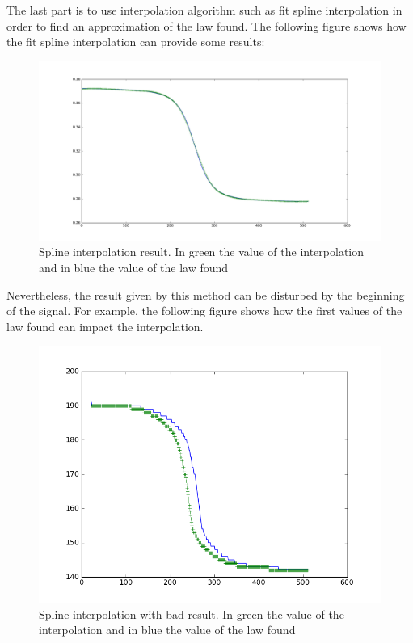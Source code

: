 The last part is to use interpolation algorithm such as fit spline interpolation in order to find an approximation of the law found. The following figure shows how the fit spline interpolation can provide some results:

\begin{figure}[H]
\centering
    \includegraphics[scale=0.35,angle=0]{Images/spline_pour_la_loi_de_frequence_trouvee.png}
    \caption{Spline interpolation result. In green the value of the interpolation and in blue the value of the law found}
    \label{fig:spline_pour_la_loi_de_frequence_trouvee}
\end{figure}

Nevertheless, the result given by this method can be disturbed by the beginning of the signal. For example, the following figure shows how the first values of the law found can impact the interpolation.

\begin{figure}[H]
\centering
    \includegraphics[scale=0.6,angle=0]{Images/spline_pour_la_loi_de_frequence_trouvee2.png}
    \caption{Spline interpolation with bad result. In green the value of the interpolation and in blue the value of the law found}
    \label{fig:spline_pour_la_loi_de_frequence_trouvee2}
\end{figure}

